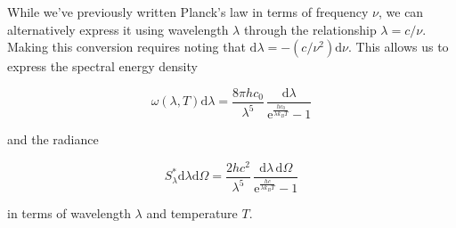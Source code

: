 \documentclass[
  a4paper,
]{book}
\begin{document}
While we've previously written Planck's law in terms of frequency
\(\nu\), we can alternatively express it using wavelength \(\lambda\)
through the relationship \(\lambda = c/\nu\). Making this conversion
requires noting that
\(\mathrm{d}\lambda = -\left( c / \nu^2 \right) \mathrm{d} \nu\). This
allows us to express the spectral energy density

\[
\omega \left( \lambda,T \right) \mathrm{d} \lambda = \frac{8 \pi h c_0}{\lambda^5} \, \frac{\mathrm{d} \lambda}{\mathrm{e}^{\frac{h c_0}{\lambda k_B T}} -1}
\]

and the radiance

\[
S^{\ast}_{\lambda} \mathrm{d} \lambda \mathrm{d} \Omega = \frac{2 h c^2}{\lambda^5} \, \frac{\mathrm{d} \lambda \, \mathrm{d} \Omega}{\mathrm{e}^{\frac{h c}{\lambda k_B T}} -1}
\]

in terms of wavelength \(\lambda\) and temperature \(T\).
\end{document}
